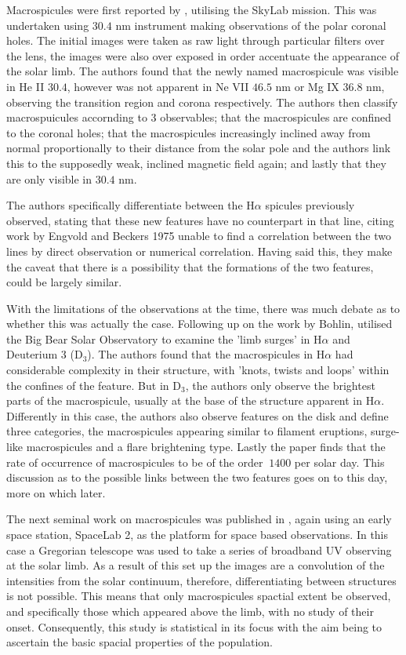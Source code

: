 Macrospicules were first reported by \cite{Bohlin1975}, utilising the SkyLab mission.
This was undertaken using $30.4$ nm instrument making observations of the polar coronal holes.
The initial images were taken as raw light through particular filters over the lens, the images were also over exposed in order accentuate the appearance of the solar limb.
The authors found that the newly named macrospicule was visible in He II $30.4$, however was not apparent in Ne VII $46.5$ nm or Mg IX $36.8$ nm, observing the transition region and corona respectively.
The authors then classify macrospuicules accornding to 3 observables; that the macrospicules are confined to the coronal holes; that the macrospicules increasingly inclined away from normal proportionally to their distance from the solar pole and the authors link this to the supposedly weak, inclined magnetic field again; and lastly that they are only visible in $30.4$ nm.
 

The authors specifically differentiate between the H$\alpha$ spicules previously observed, stating that these new features have no counterpart in that line, citing work by Engvold and Beckers 1975 unable to find a correlation between the two lines by direct observation or numerical correlation.
Having said this, they make the caveat that there is a possibility that the formations of the two features, could be largely similar.

With the limitations of the observations at the time, there was much debate as to whether this was actually the case. 
Following up on the work by Bohlin, \cite{LaBonte79} utilised the Big Bear Solar Observatory to examine the 'limb surges' in H$\alpha$ and Deuterium 3 (D$_3$).
The authors found that the macrospicules in H$\alpha$ had considerable complexity in their structure, with 'knots, twists and loops' within the confines of the feature.
But in D$_3$, the authors only observe the brightest parts of the macrospicule, usually at the base of the structure apparent in H$\alpha$.
Differently in this case, the authors also observe features on the disk and define three categories, the macrospicules appearing similar to filament eruptions, surge-like macrospicules and a flare brightening type.
Lastly the paper finds that the rate of occurrence of macrospicules to be of the order $~1400$ per solar day. 
This discussion as to the possible links between the two features goes on to this day, more on which later.

The next seminal work on macrospicules was published in \cite{Dere89}, again using an early space station, SpaceLab 2, as the platform for space based observations.
In this case a Gregorian telescope was used to take a series of broadband UV observing at the solar limb.
As a result of this set up the images are a convolution of the intensities from the solar continuum, therefore, differentiating between structures is not possible.
This means that only macrospicules spactial extent be observed, and specifically those which appeared above the limb, with no study of their onset.
Consequently, this study is statistical in its focus with the aim being to ascertain the basic spacial properties of the population.

